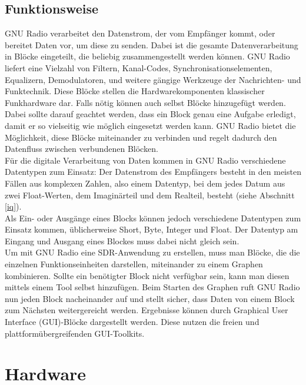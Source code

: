 \subsection{Funktionsweise}
GNU Radio verarbeitet den Datenstrom, der vom Empfänger kommt, oder bereitet Daten vor, um diese zu senden. Dabei ist die gesamte Datenverarbeitung in Blöcke eingeteilt, die  beliebig  zusammengestellt  werden können. GNU Radio liefert eine Vielzahl von Filtern, Kanal-Codes, Synchronisationselementen, Equalizern, Demodulatoren, und weitere gängige Werkzeuge der Nachrichten- und Funktechnik. Diese Blöcke stellen die Hardwarekomponenten klassischer Funkhardware dar. Falls nötig können auch selbst Blöcke hinzugefügt werden. Dabei sollte darauf geachtet werden, dass ein Block genau eine Aufgabe erledigt, damit er so vielseitig wie möglich eingesetzt werden kann. GNU Radio bietet die Möglichkeit, diese Blöcke miteinander zu verbinden und regelt dadurch den Datenfluss zwischen verbundenen Blöcken. \\
Für die digitale Verarbeitung von Daten kommen in GNU Radio verschiedene Datentypen zum Einsatz: Der Datenstrom des Empfängers besteht in den meisten Fällen aus komplexen Zahlen, also einem Datentyp, bei dem jedes Datum aus zwei Float-Werten, dem Imaginärteil und dem Realteil, besteht (siehe Abschnitt \ref{iq}). \\
Als Ein- oder Ausgänge eines Blocks können jedoch verschiedene Datentypen zum Einsatz kommen, üblicherweise Short, Byte, Integer und Float. Der Datentyp am Eingang und Ausgang eines Blockes muss dabei nicht gleich sein.\\
Um mit GNU Radio eine SDR-Anwendung zu erstellen, muss man Blöcke, die die einzelnen Funktionseinheiten darstellen, miteinander zu einem Graphen kombinieren. Sollte ein benötigter Block nicht verfügbar sein, kann man diesen mittels einem Tool selbst hinzufügen. Beim Starten des Graphen ruft GNU Radio nun jeden Block nacheinander auf und stellt sicher, dass Daten von einem Block zum Nächsten weitergereicht werden. Ergebnisse  können  durch  Graphical  User  Interface  (GUI)-Blöcke dargestellt werden. Diese nutzen die freien und plattformübergreifenden GUI-Toolkits.


\section{Hardware}

